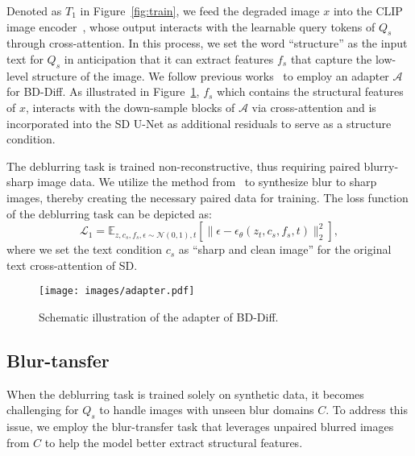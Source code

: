 Denoted as $T_1$ in Figure~\ref{fig:train}, we feed the degraded image $x$ into the CLIP image encoder~\cite{radford2021learning}, whose output interacts with the learnable query tokens of $Q_s$ through cross-attention. In this process, we set the word ``structure'' as the input text for $Q_s$ in anticipation that it can extract features $f_s$ that capture the low-level structure of the image. We follow previous works~\cite{liu2024diff,lin2025diffbir} to employ an adapter $\mathcal{A}$ for BD-Diff. As illustrated in Figure~\ref{fig:adapter}, $f_s$ which contains the structural features of $x$, interacts with the down-sample blocks of $\mathcal{A}$ via cross-attention and is incorporated into the SD U-Net as additional residuals to serve as a structure condition.

The deblurring task is trained non-reconstructive, thus requiring paired blurry-sharp image data. We utilize the method from~\cite{hendrycks2019benchmarking} to synthesize blur to sharp images, thereby creating the necessary paired data for training. The loss function of the deblurring task can be depicted as:
\begin{equation}
\label{eq:loss1}
\mathcal{L}_1 = 
\mathbb{E}_{z,c_s,f_s,\epsilon \sim \mathcal{N}(0,1),t} \left[ \| \epsilon - \epsilon_\theta (z_t, c_s, f_s, t) \|_2^2 \right], 
\end{equation}
where we set the text condition $c_s$ as ``sharp and clean image'' for the original text cross-attention of SD.

\begin{figure}[t]
	\centering
	\texttt{[image: images/adapter.pdf]}
	\caption{Schematic illustration of the adapter of BD-Diff.}
	\label{fig:adapter}
\end{figure}

\subsection{Blur-tansfer}
\label{sec:task2}

When the deblurring task is trained solely on synthetic data, it becomes challenging for $Q_s$ to handle images with unseen blur domains $C$. To address this issue, we employ the blur-transfer task that leverages unpaired blurred images from $C$ to help the model better extract structural features. 

